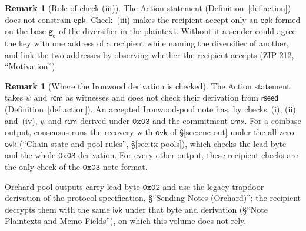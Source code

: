 \documentclass[11pt,a4paper]{article}
\theoremstyle{definition}
\newtheorem{remark}[theorem]{Remark}
\newcommand{\cmx}{\mathsf{cmx}}
\newcommand{\ivk}{\ensuremath{\mathsf{ivk}}}
\newcommand{\ovk}{\ensuremath{\mathsf{ovk}}}
\newcommand{\gd}{\ensuremath{\mathsf{g_d}}}
\newcommand{\rcm}{\ensuremath{\mathsf{rcm}}}
\begin{document}
\begin{remark}[Role of check (iii)]
The Action statement (Definition~\ref{def:action}) does not constrain
$\mathsf{epk}$. Check~(iii) makes the recipient accept only an
$\mathsf{epk}$ formed on the base $\gd$ of the diversifier in the plaintext.
Without it a sender could agree the key with one address of a recipient
while naming the diversifier of another, and link the two addresses by
observing whether the recipient accepts (ZIP 212, ``Motivation'').
\end{remark}

\begin{remark}[Where the Ironwood derivation is checked]
The Action statement takes $\psi$ and $\rcm$ as witnesses and does not check
their derivation from $\mathsf{rseed}$ (Definition~\ref{def:action}). An
accepted Ironwood-pool note has, by checks~(i), (ii) and~(iv), $\psi$ and
$\rcm$ derived under $\mathtt{0x03}$ and the commitment $\cmx$. For a
coinbase output, consensus runs the recovery with $\ovk$ of
\S\ref{sec:enc-out} under the all-zero $\ovk$ (``Chain state and pool
rules'', \S\ref{sec:tx-pools}), which checks the lead byte and the whole
$\mathtt{0x03}$ derivation. For every other output, these recipient checks
are the only check of the $\mathtt{0x03}$ note format.
\end{remark}

Orchard-pool outputs carry lead byte $\mathtt{0x02}$ and use the legacy
trapdoor derivation of the protocol specification, \S``Sending Notes
(Orchard)''; the recipient decrypts them with the same $\ivk$ under that
byte and derivation (\S``Note Plaintexts and Memo Fields''), on which this
volume does not rely.
\end{document}
